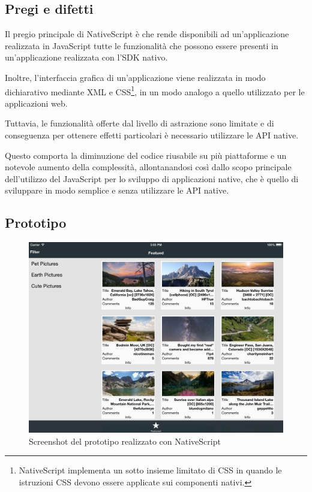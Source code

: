 \subsection{Pregi e difetti}

Il pregio principale di NativeScript è che rende disponibili ad un'applicazione realizzata in JavaScript tutte le funzionalità che possono essere presenti in un'applicazione realizzata con l'SDK nativo. 

Inoltre, l'interfaccia grafica di un'applicazione viene realizzata in modo dichiarativo mediante XML e CSS\footnote{NativeScript implementa un sotto insieme limitato di CSS in quando le istruzioni CSS devono essere applicate sui componenti nativi.}, in un modo analogo a quello utilizzato per le applicazioni web.

Tuttavia, le funzionalità offerte dal livello di astrazione sono limitate e di conseguenza per ottenere effetti particolari è necessario utilizzare le API native.

Questo comporta la diminuzione del codice riusabile su più piattaforme e un notevole aumento della complessità, allontanandosi così dallo scopo principale dell'utilizzo del JavaScript per lo sviluppo di applicazioni native, che è quello di sviluppare in modo semplice e senza utilizzare le API native.

\subsection{Prototipo}

\begin{figure}[htp]
\centering
\includegraphics[width=\textwidth]{../immagini/prototipo-react-native}
\caption{Screenshot del prototipo realizzato con NativeScript}  
\end{figure}

